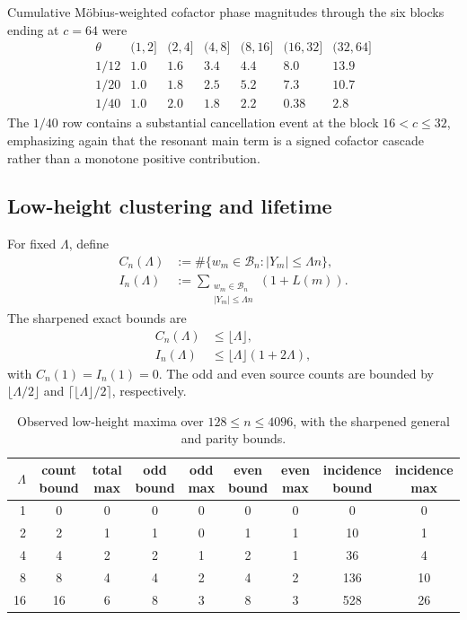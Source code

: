 \documentclass[11pt]{article}
\theoremstyle{definition}
\theoremstyle{remark}
\newcommand{\1}{\mathbf{1}}
\begin{document}
Cumulative M\"obius-weighted cofactor phase magnitudes through the six blocks ending
at $c=64$ were
\begin{equation}
\begin{array}{c|rrrrrr}
\theta & (1,2]&(2,4]&(4,8]&(8,16]&(16,32]&(32,64]\\
\hline
1/12 & 1.0&1.6&3.4&4.4&8.0&13.9\\
1/20 & 1.0&1.8&2.5&5.2&7.3&10.7\\
1/40 & 1.0&2.0&1.8&2.2&0.38&2.8
\end{array}
\label{eq:extended-cofactor-phase-cascade}
\end{equation}
The $1/40$ row contains a substantial cancellation event at the block
$16<c\le32$, emphasizing again that the resonant main term is a signed cofactor
cascade rather than a monotone positive contribution.

\subsection{Low-height clustering and lifetime}

For fixed $\Lambda$, define
\begin{align}
 C_n(\Lambda)
 &:={\#}\{w_m\in\mathscr B_n:|Y_m|\le\Lambda n\},
 \label{eq:C-lambda}\\
 I_n(\Lambda)
 &:={\sum}_{\substack{w_m\in\mathscr B_n\\|Y_m|\le\Lambda n}}
 (1+L(m)).
 \label{eq:I-lambda}
\end{align}
The sharpened exact bounds are
\begin{align}
 C_n(\Lambda)&\le\lfloor\Lambda\rfloor,
 \label{eq:C-pass}\\
 I_n(\Lambda)&\le\lfloor\Lambda\rfloor(1+2\Lambda),
 \label{eq:I-pass}
\end{align}
with $C_n(1)=I_n(1)=0$.  The odd and even source counts are bounded by
$\lfloor\Lambda/2\rfloor$ and
$\lceil\lfloor\Lambda\rfloor/2\rceil$, respectively.

\begin{table}[htbp]
\centering
\caption{Observed low-height maxima over $128\le n\le4096$, with the
sharpened general and parity bounds.}
\label{tab:low-height-numerical}
\scriptsize
\setlength{\tabcolsep}{3.5pt}
\begin{tabular}{rcccccccc}
\toprule
$\Lambda$ &
count bound & total max &
odd bound & odd max &
even bound & even max &
incidence bound & incidence max\\
\midrule
1  & 0  & 0 & 0 & 0 & 0 & 0 & 0   & 0\\
2  & 2  & 1 & 1 & 0 & 1 & 1 & 10  & 1\\
4  & 4  & 2 & 2 & 1 & 2 & 1 & 36  & 4\\
8  & 8  & 4 & 4 & 2 & 4 & 2 & 136 & 10\\
16 & 16 & 6 & 8 & 3 & 8 & 3 & 528 & 26\\
\bottomrule
\end{tabular}
\end{table}
\end{document}
